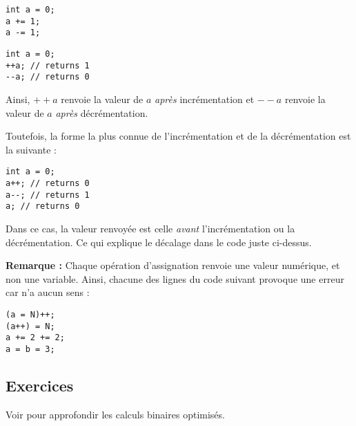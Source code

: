 \documentclass[../../../main.tex]{subfiles}
\begin{document}
\begin{minipage}{0.5\textwidth}
\begin{verbatim}
int a = 0;
a += 1;
a -= 1;
\end{verbatim}
\end{minipage}
\begin{minipage}{0.5\textwidth}
\begin{verbatim}
int a = 0;
++a; // returns 1
--a; // returns 0
\end{verbatim}
\end{minipage}

Ainsi, $++a$ renvoie la valeur de $a$ \textit{après} incrémentation et $--a$ renvoie la valeur de $a$ \textit{après} décrémentation.
 
Toutefois, la forme la plus connue de l'incrémentation et de la décrémentation est la suivante :
\begin{verbatim}
int a = 0;
a++; // returns 0
a--; // returns 1
a; // returns 0
\end{verbatim}
Dans ce cas, la valeur renvoyée est celle \textit{avant} l'incrémentation ou la décrémentation. Ce qui explique le décalage dans le code juste ci-dessus.
 
\textbf{Remarque :} Chaque opération d'assignation renvoie une valeur numérique, et non une variable. Ainsi, chacune des lignes du code suivant provoque une erreur car n'a aucun sens :
\begin{verbatim}
(a = N)++;
(a++) = N;
a += 2 += 2;
a = b = 3;
\end{verbatim}
\subsection{Exercices}
Voir \cite{BitHacks} pour approfondir les calculs binaires optimisés.
\end{document}
